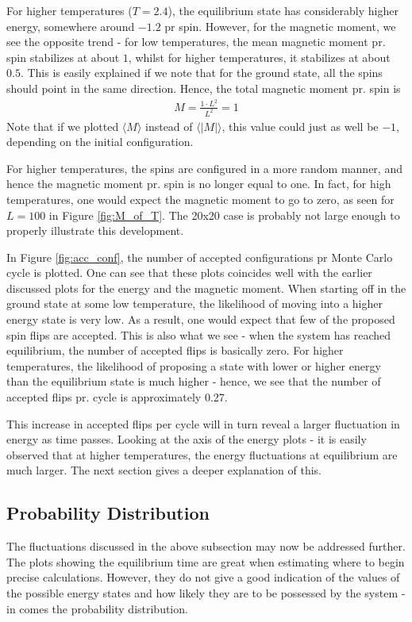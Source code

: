 \documentclass[12pt,english,a4paper]{article}
\begin{document}
For higher temperatures ($T=2.4$), the equilibrium state has considerably higher energy, somewhere around $-1.2$ pr spin. However, for the magnetic moment, we see the opposite trend - for low temperatures, the mean magnetic moment pr. spin stabilizes at about $1$, whilst for higher temperatures, it stabilizes at about $0.5$. This is easily explained if we note that for the ground state, all the spins should point in the same direction. Hence, the total magnetic moment pr. spin is 
\begin{align*}
    M = \frac{1 \cdot L^2}{L^2} = 1
\end{align*}
Note that if we plotted $\langle M \rangle$ instead of $\langle |M| \rangle$, this value could just as well be $-1$, depending on the initial configuration.

For higher temperatures, the spins are configured in a more random manner, and hence the magnetic moment pr. spin is no longer equal to one. In fact, for high temperatures, one would expect the magnetic moment to go to zero, as seen for $L=100$ in Figure \ref{fig:M_of_T}. The 20x20 case is probably not large enough to properly illustrate this development. 

In Figure \ref{fig:acc_conf}, the number of accepted configurations pr Monte Carlo cycle is plotted. One can see that these plots coincides well with the earlier discussed plots for the energy and the magnetic moment. When starting off in the ground state at some low temperature, the likelihood of moving into a higher energy state is very low. As a result, one would expect that few of the proposed spin flips are accepted. This is also what we see - when the system has reached equilibrium, the number of accepted flips is basically zero. For higher temperatures, the likelihood of proposing a state with lower or higher energy than the equilibrium state is much higher - hence, we see that the number of accepted flips pr. cycle is approximately 0.27.

This increase in accepted flips per cycle will in turn reveal a larger fluctuation in energy as time passes. Looking at the axis of the energy plots - it is easily observed that at higher temperatures, the energy fluctuations at equilibrium are much larger. The next section gives a deeper explanation of this.

\subsection{Probability Distribution}
The fluctuations discussed in the above subsection may now be addressed further. The plots showing the equilibrium time are great when estimating where to begin precise calculations. However, they do not give a good indication of the values of the possible energy states and how likely they are to be possessed by the system - in comes the probability distribution.
\end{document}
